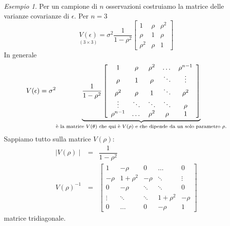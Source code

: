 \documentclass[a4paper]{report}
\newcounter{ese}
\theoremstyle{remark}
\newtheorem{esempio}[ese]{Esempio}
\newcounter{theor}
\begin{document}
\begin{esempio}
Per un campione di $n$ osservazioni costruiamo la matrice delle varianze
covarianze di $\epsilon $. Per $n=3$ 
\begin{equation*}
\underset{(3\times 3)}{V(\epsilon )}=\sigma ^{2}\dfrac{1}{1-\rho ^{2}}\left[ 
\begin{array}{ccc}
1 & \rho & \rho ^{2} \\ 
\rho & 1 & \rho \\ 
\rho ^{2} & \rho & 1%
\end{array}%
\right]
\end{equation*}%
In generale 
\begin{equation*}
V(\epsilon )=\sigma ^{2}\underset{\text{\`{e} la matrice }V(\theta )\text{
che qui \`{e} }V(\rho )\text{ e che dipende da un solo parametro }\rho .}{%
\underbrace{\dfrac{1}{1-\rho ^{2}}\left[ 
\begin{array}{ccccc}
1 & \rho & \rho ^{2} & \dots & \rho ^{n-1} \\ 
\rho & 1 & \rho & \ddots & \vdots \\ 
\rho ^{2} & \rho & 1 & \ddots & \rho ^{2} \\ 
\vdots & \ddots & \ddots & \ddots & \rho \\ 
\rho ^{n-1} & \dots & \rho ^{2} & \rho & 1%
\end{array}%
\right] }}
\end{equation*}%
Sappiamo tutto sulla matrice $V(\rho )$:%
\begin{eqnarray*}
\mid V(\rho )\mid &=&\dfrac{1}{1-\rho ^{2}} \\
V(\rho )^{-1} &=&\left[ 
\begin{array}{ccccc}
1 & -\rho & 0 & \dots & 0 \\ 
-\rho & 1+\rho ^{2} & -\rho & \ddots & \vdots \\ 
0 & -\rho & \ddots & \ddots & 0 \\ 
\vdots & \ddots & \ddots & 1+\rho ^{2} & -\rho \\ 
0 & \dots & 0 & -\rho & 1%
\end{array}%
\right]
\end{eqnarray*}
matrice tridiagonale.
\end{esempio}
\end{document}
